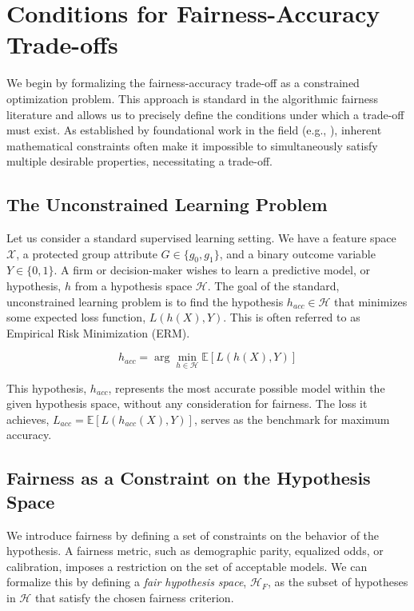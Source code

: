 \section{Conditions for Fairness-Accuracy Trade-offs}

We begin by formalizing the fairness-accuracy trade-off as a constrained optimization problem. This approach is standard in the algorithmic fairness literature and allows us to precisely define the conditions under which a trade-off must exist. As established by foundational work in the field (e.g., \citealp{Kleinberg2017, Chouldechova2017}), inherent mathematical constraints often make it impossible to simultaneously satisfy multiple desirable properties, necessitating a trade-off.

\subsection{The Unconstrained Learning Problem}

Let us consider a standard supervised learning setting. We have a feature space $\mathcal{X}$, a protected group attribute $G \in \{g_0, g_1\}$, and a binary outcome variable $Y \in \{0, 1\}$. A firm or decision-maker wishes to learn a predictive model, or hypothesis, $h$ from a hypothesis space $\mathcal{H}$. The goal of the standard, unconstrained learning problem is to find the hypothesis $h_{acc} \in \mathcal{H}$ that minimizes some expected loss function, $L(h(X), Y)$. This is often referred to as Empirical Risk Minimization (ERM).

\begin{equation}
h_{acc} = \arg\min_{h \in \mathcal{H}} \mathbb{E}[L(h(X), Y)]
\end{equation}

This hypothesis, $h_{acc}$, represents the most accurate possible model within the given hypothesis space, without any consideration for fairness. The loss it achieves, $L_{acc} = \mathbb{E}[L(h_{acc}(X), Y)]$, serves as the benchmark for maximum accuracy.

\subsection{Fairness as a Constraint on the Hypothesis Space}

We introduce fairness by defining a set of constraints on the behavior of the hypothesis. A fairness metric, such as demographic parity, equalized odds, or calibration, imposes a restriction on the set of acceptable models. We can formalize this by defining a \textit{fair hypothesis space}, $\mathcal{H}_F$, as the subset of hypotheses in $\mathcal{H}$ that satisfy the chosen fairness criterion.

